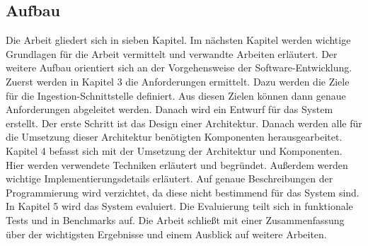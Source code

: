 \subsection{Aufbau}
Die Arbeit gliedert sich in sieben Kapitel.
Im nächsten Kapitel werden wichtige Grundlagen für die Arbeit vermittelt und verwandte Arbeiten erläutert. 
Der weitere Aufbau orientiert sich an der Vorgehensweise der Software-Entwicklung.
Zuerst werden in Kapitel 3 die Anforderungen ermittelt.
Dazu werden die Ziele für die Ingestion-Schnittstelle definiert.
Aus diesen Zielen können dann genaue Anforderungen abgeleitet werden.
Danach wird ein Entwurf für das System erstellt.
Der erste Schritt ist das Design einer Architektur.
Danach werden alle für die Umsetzung dieser Architektur benötigten Komponenten herausgearbeitet.
Kapitel 4 befasst sich mit der Umsetzung der Architektur und Komponenten.
Hier werden verwendete Techniken erläutert und begründet.
Außerdem werden wichtige Implementierungsdetails erläutert.
Auf genaue Beschreibungen der Programmierung wird verzichtet, da diese nicht bestimmend für das System sind.
In Kapitel 5 wird das System evaluiert.
Die Evaluierung teilt sich in funktionale Tests und in Benchmarks auf.
Die Arbeit schließt mit einer Zusammenfassung über der wichtigsten Ergebnisse und einem Ausblick auf weitere Arbeiten.